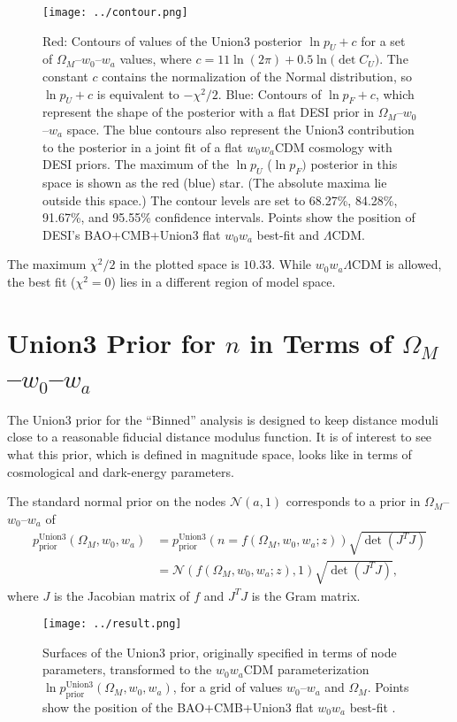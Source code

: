 \documentclass[11pt,a4paper]{article}
\begin{document}
\begin{figure}[htbp] %
   \centering
   \texttt{[image: ../contour.png]} 
   \caption{Red: Contours of values of the Union3 posterior $\ln{p_U}+c$ for a
set of $\Omega_M$--$w_0$--$w_a$ values, where $c= 11\ln{(2\pi)} + 0.5\ln({\det{C_U})}$.  The constant $c$ contains the
normalization of the Normal distribution, so $\ln{p_U}+c$  is equivalent to  $-\chi^2/2$.   
   Blue: Contours of  $\ln{p_F} +c  $, which represent the shape of the posterior with a flat DESI prior in  $\Omega_M$--$w_0$--$w_a$ space.   
   The blue contours  also represent the Union3 contribution to the posterior in a joint fit of a flat $w_0w_a$CDM cosmology with DESI priors.
   The maximum of the $\ln{p}_U$  ($\ln{p}_F)$ posterior in this space is shown as the red (blue) star.  (The absolute maxima
   lie outside this space.)
   The contour levels are set to 68.27\%, 84.28\%, 91.67\%, and 95.55\% confidence intervals. 
   Points show the position of DESI's  BAO+CMB+Union3 flat $w_0w_a$ best-fit 
    and  $\Lambda$CDM.}
   \label{fig:posterior}
\end{figure}

The maximum $\chi^2/2$ in the plotted space is $10.33$.  While $w_0w_a\Lambda$CDM is allowed, the best fit ($\chi^2=0$) lies in a
different region of model space. 

\section{Union3 Prior for $n$ in Terms of $\Omega_M$--$w_0$--$w_a$}
\label{sec:prior}
The Union3 prior for the ``Binned'' analysis is designed to keep distance moduli close to a reasonable
fiducial distance modulus function.  It is of interest to see what this prior, which is defined in magnitude
space, looks like in terms of cosmological and dark-energy parameters.

The standard normal prior on the nodes $\mathcal{N}(a,1)$ corresponds to a prior in  $\Omega_M$--$w_0$--$w_a$ of
\begin{align}
p^\text{Union3}_\text{prior}(\Omega_M, w_0,w_a)  & =p^\text{Union3}_\text{prior}(n=f(\Omega_M, w_0, w_a; z))  \sqrt{\det{\left(J^T J\right)}} \\
& = \mathcal{N}(f(\Omega_M, w_0, w_a; z),1)  \sqrt{\det{\left(J^T J\right)}},
\end{align}
where $J$ is the Jacobian matrix of $f$ and $J^TJ$ is the Gram matrix.

\begin{figure}[htbp] %
   \centering
   \texttt{[image: ../result.png]} 
   \caption{Surfaces of the Union3 prior, originally specified in terms of node parameters, transformed to the $w_0w_a$CDM parameterization
   $\ln{p^\text{Union3}_\text{prior}}(\Omega_M, w_0,w_a)$,  for a grid of values
 $w_0$--$w_a$ and $\Omega_M$.   
   Points show the position of the BAO+CMB+Union3 flat $w_0w_a$ best-fit .}
   \label{fig:priors}
\end{figure}
\end{document}
